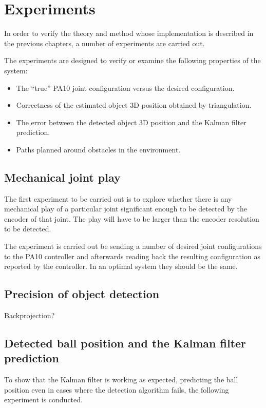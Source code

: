 \chapter{Experiments}
\label{cha:experiments}
In order to verify the theory and method whose implementation is described in the previous chapters, a number of experiments are carried out.

The experiments are designed to verify or examine the following properties of the system:
\begin{itemize}
    \item The ``true'' PA10 joint configuration versus the desired configuration.
    \item Correctness of the estimated object 3D position obtained by triangulation. %
    \item The error between the detected object 3D position and the Kalman filter prediction.
    \item Paths planned around obstacles in the environment.
\end{itemize}

\section{Mechanical joint play}
The first experiment to be carried out is to explore whether there is any mechanical play of a particular joint significant enough to be detected by the encoder of that joint.
The play will have to be larger than the encoder resolution to be detected.

The experiment is carried out be sending a number of desired joint configurations to the PA10 controller and afterwards reading back the resulting configuration as reported by the controller.
In an optimal system they should be the same.

\section{Precision of object detection}
Backprojection?

\section{Detected ball position and the Kalman filter prediction}
To show that the Kalman filter is working as expected,
predicting the ball position even in cases where the detection algorithm fails, the following experiment is conducted.

